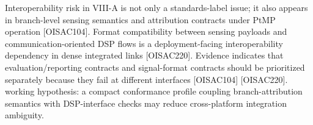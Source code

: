 {}
\markdownRendererSectionEnd \markdownRendererSectionBegin
{}\markdownRendererInterblockSeparator
{}\markdownRendererUlBeginTight
\markdownRendererUlItem Interoperability risk in VIII-A is not only a standards-label issue; it also appears in branch-level sensing semantics and attribution contracts under PtMP operation [O\markdownRendererUnderscore{}ISAC\markdownRendererUnderscore{}104].\markdownRendererUlItemEnd 
\markdownRendererUlItem Format compatibility between sensing payloads and communication-oriented DSP flows is a deployment-facing interoperability dependency in dense integrated links [O\markdownRendererUnderscore{}ISAC\markdownRendererUnderscore{}220].\markdownRendererUlItemEnd 
\markdownRendererUlItem Evidence indicates that evaluation/reporting contracts and signal-format contracts should be prioritized separately because they fail at different interfaces [O\markdownRendererUnderscore{}ISAC\markdownRendererUnderscore{}104] [O\markdownRendererUnderscore{}ISAC\markdownRendererUnderscore{}220].\markdownRendererUlItemEnd 
\markdownRendererUlItem working hypothesis: a compact conformance profile coupling branch-attribution semantics with DSP-interface checks may reduce cross-platform integration ambiguity.\markdownRendererUlItemEnd 
\markdownRendererUlEndTight \markdownRendererInterblockSeparator
{}
\markdownRendererSectionEnd 
\markdownRendererSectionEnd \markdownRendererSectionBegin
{}\markdownRendererInterblockSeparator
{}\markdownRendererSectionBegin
{}\markdownRendererInterblockSeparator
